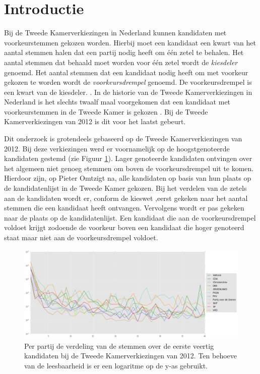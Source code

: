 \section{Introductie}
\label{sec:intro}
Bij de Tweede Kamerverkiezingen in Nederland kunnen kandidaten met voorkeurstemmen gekozen worden. Hierbij moet een kandidaat een kwart van het aantal stemmen halen dat een partij nodig heeft om één zetel te behalen. Het aantal stemmen dat behaald moet worden voor één zetel wordt de \textit{kiesdeler} genoemd. Het aantal stemmen dat een kandidaat nodig heeft om met voorkeur gekozen te worden wordt de \textit{voorkeursdrempel} genoemd. De voorkeursdrempel is een kwart van de kiesdeler.  \citep{Kiesraad_voorkeursdrempel2}.  In de historie van de Tweede Kamerverkiezingen in Nederland is het  slechts twaalf maal voorgekomen dat een kandidaat met voorkeurstemmen in de Tweede Kamer is gekozen \citep{Voork74:online}. Bij de Tweede Kamerverkiezingen van 2012 is dit voor het laatst gebeurt. \

Dit onderzoek is grotendeels gebaseerd op de Tweede Kamerverkiezingen van 2012. Bij deze verkiezingen werd er voornamelijk op de hoogstgenoteerde kandidaten gestemd (zie Figuur \ref{fig:sv2012}). Lager genoteerde kandidaten ontvingen over het algemeen niet genoeg stemmen om boven de voorkeursdrempel uit te komen. Hierdoor zijn, op Pieter Omtzigt na, alle kandidaten op basis van hun plaats op de kandidatenlijst in de Tweede Kamer gekozen. Bij het verdelen van de zetels aan de kandidaten wordt er, conform de kieswet \citeyearpar{kieswetje},eerst gekeken naar het aantal stemmen die een kandidaat heeft ontvangen. Vervolgens wordt er pas gekeken naar de plaats op de kandidatenlijst. Een kandidaat die aan de voorkeursdrempel voldoet krijgt zodoende de voorkeur boven een kandidaat die hoger genoteerd staat maar niet aan de voorkeursdrempel voldoet. 


\begin{figure}[H]


	\includegraphics[width=\linewidth]{verdeling_stemmen_2012.png}

			\caption{Per partij de verdeling van de stemmen over de eerste veertig kandidaten bij de Tweede Kamerverkiezingen van 2012. Ten behoeve van de leesbaarheid is er een logaritme op de y-as gebruikt.}

\label{fig:sv2012}
\end{figure}

